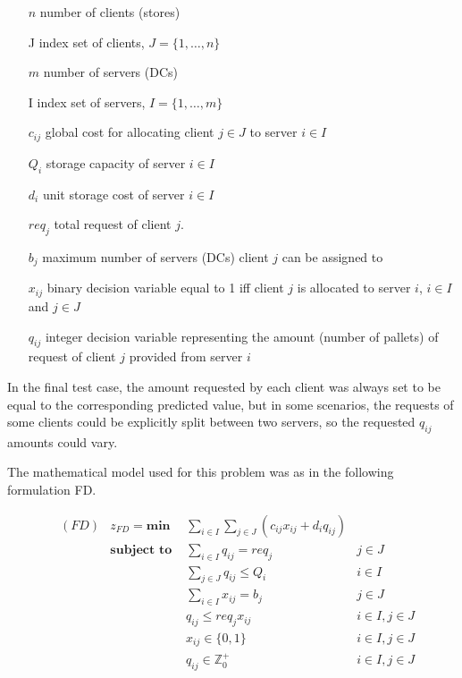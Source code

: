 \documentclass[ijoc,sglanonrev]{informs4}
\begin{document}
\begin{enumerate}
    \item[$n$] number of clients (stores)
    \item[J] index set of clients, $J=\{1, \ldots, n\}$
    \item[$m$] number of servers (DCs)
    \item[I] index set of servers, $I=\{1, \ldots, m\}$
    \item[$c_{ij}$] global cost for allocating client $j \in J$ to server $i \in I$
    \item[$Q_i$] storage capacity of server $i \in I$
    \item[$d_i$] unit storage cost of server $i \in I$
    \item[$req_j$] total request of client $j$.
    \item[$b_j$] maximum number of servers (DCs) client $j$ can be assigned to
    \item[$x_{ij}$] binary decision variable equal to 1 iff client $j$ is allocated to server $i$, $i \in I$ and $j \in J$
    \item[$q_{ij}$] integer decision variable representing the amount (number of pallets) of request of client $j$ provided from server $i$
\end{enumerate}

In the final test case, the amount requested by each client was always set to be equal to the corresponding predicted value, but in some scenarios, the requests of some clients could be explicitly split between two servers, so the requested $q_{ij}$ amounts could vary.

The mathematical model used for this problem was as in the following formulation FD.
   
\begin{align}
&(FD) & z_{FD} = \textbf{min } & \sum_{i \in I} \sum_{j \in J} ( c_{ij}x_{ij} + d_i q_{ij} ) \label{ALLobj}\\
& &  \textbf{subject to }
     & \sum_{i \in I} q_{ij} = req_j & j \in J  \label{ALLrequest}\\
& &  & \sum_{j \in J}q_{ij} \leq Q_i & i \in I \label{ALLcapacity}\\
& &  & \sum_{i \in I} x_{ij} = b_j & j \in J  \label{ALLnumserv}\\
& &  & q_{ij} \leq req_j x_{ij} & i \in I, j \in J \label{ALLcontin}\\
& &  & x_{ij} \in \{0,1\} & i\in I, j \in J \label{ALLx}\\
& &  & q_{ij} \in \mathbb{Z}^+_0 & i\in I, j \in J \label{ALLq}
\end{align}
\end{document}
